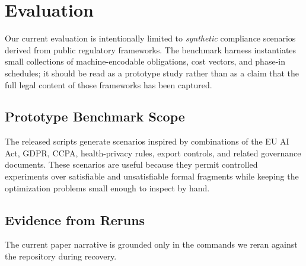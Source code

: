 \documentclass[11pt,twocolumn]{article}
\begin{document}
\section{Evaluation}
\label{sec:eval}

Our current evaluation is intentionally limited to \emph{synthetic} compliance scenarios derived from public regulatory frameworks. The benchmark harness instantiates small collections of machine-encodable obligations, cost vectors, and phase-in schedules; it should be read as a prototype study rather than as a claim that the full legal content of those frameworks has been captured.

\subsection{Prototype Benchmark Scope}

The released scripts generate scenarios inspired by combinations of the EU AI Act, GDPR, CCPA, health-privacy rules, export controls, and related governance documents. These scenarios are useful because they permit controlled experiments over satisfiable and unsatisfiable formal fragments while keeping the optimization problems small enough to inspect by hand.

\subsection{Evidence from Reruns}

The current paper narrative is grounded only in the commands we reran against the repository during recovery.
\end{document}
